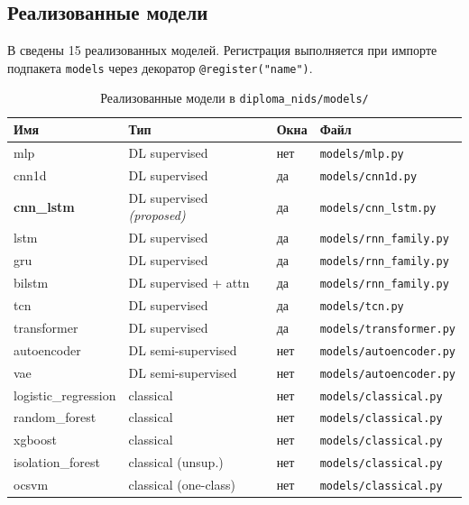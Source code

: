\subsection{Реализованные модели}

В  сведены 15 реализованных моделей.
Регистрация выполняется при импорте подпакета \texttt{models}
через декоратор \texttt{@register("name")}.

\begin{table}[H]
\centering
\caption{Реализованные модели в \texttt{diploma\_nids/models/}}
\label{tab:models-impl}
\renewcommand{\arraystretch}{1.2}
\small
\begin{tabularx}{\linewidth}{@{}lllX@{}}
\toprule
\textbf{Имя} & \textbf{Тип} & \textbf{Окна} & \textbf{Файл} \\
\midrule
mlp                  & DL supervised        & нет & \texttt{models/mlp.py} \\
cnn1d                & DL supervised        & да  & \texttt{models/cnn1d.py} \\
\textbf{cnn\_lstm}   & DL supervised \emph{(proposed)} & да & \texttt{models/cnn\_lstm.py} \\
lstm                 & DL supervised        & да  & \texttt{models/rnn\_family.py} \\
gru                  & DL supervised        & да  & \texttt{models/rnn\_family.py} \\
bilstm               & DL supervised + attn & да  & \texttt{models/rnn\_family.py} \\
tcn                  & DL supervised        & да  & \texttt{models/tcn.py} \\
transformer          & DL supervised        & да  & \texttt{models/transformer.py} \\
autoencoder          & DL semi-supervised   & нет & \texttt{models/autoencoder.py} \\
vae                  & DL semi-supervised   & нет & \texttt{models/autoencoder.py} \\
logistic\_regression & classical            & нет & \texttt{models/classical.py} \\
random\_forest       & classical            & нет & \texttt{models/classical.py} \\
xgboost              & classical            & нет & \texttt{models/classical.py} \\
isolation\_forest    & classical (unsup.)   & нет & \texttt{models/classical.py} \\
ocsvm                & classical (one-class)& нет & \texttt{models/classical.py} \\
\bottomrule
\end{tabularx}
\end{table}

